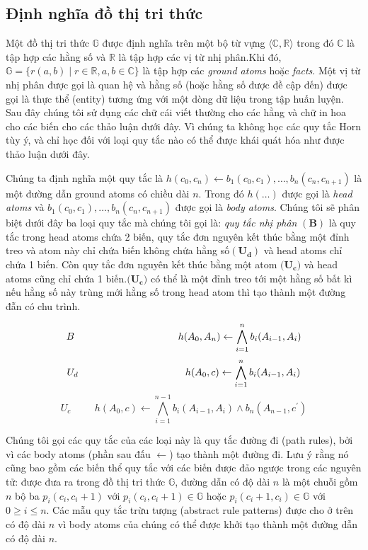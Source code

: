 \subsection{Định nghĩa đồ thị  tri thức}
Một đồ thị tri thức \(\mathbb{G}\) được định nghĩa trên một bộ từ vựng \(\langle \mathbb{C}, \mathbb{R} \rangle\) trong đó \(\mathbb{C}\) là tập hợp các hằng số và \(\mathbb{R}\) là tập hợp các vị từ nhị phân.Khi đó, \(\mathbb{G} = \{r (a, b) \mid r \in \mathbb{R}, a, b \in \mathbb{C}\}\) là tập hợp các \textit{ground atoms} hoặc \textit{facts}. Một vị từ nhị phân được gọi là quan hệ và hằng số (hoặc hằng số được đề cập đến) được gọi là thực thể (entity) tương ứng với một dòng dữ liệu trong tập huấn luyện. Sau đây chúng tôi sử dụng các chữ cái viết thường cho các hằng và chữ in hoa cho các biến cho các thảo luận dưới đây. Vì chúng ta không học các quy tắc Horn tùy ý, và chỉ học đối với loại quy tắc nào có thể được khái quát hóa như được thảo luận dưới đây.

Chúng ta định nghĩa một quy tắc là \(h(c_0, c_n) \gets b_1(c_0, c_1) ,\dots ,b_n(c_{n}, c_{n + 1})\) là một đường dẫn ground atoms có chiều dài \(n\). Trong đó \(h(\dots)\) được gọi là \textit{head atoms} và \( b_1(c_0, c_1) ,\dots ,b_n(c_{n}, c_{n + 1})\) được gọi là \textit{body atoms}. Chúng tôi sẽ phân biệt dưới đây ba loại quy tắc mà chúng tôi gọi là: \textit{quy tắc nhị phân} \((\mathbf{B})\) là quy tắc trong head atoms chứa 2 biến, quy tắc đơn nguyên kết thúc bằng một đỉnh treo  và atom này chỉ chứa biến không chứa hằng số\((\mathbf{U_d})\) và head atoms chỉ chứa 1 biến. Còn quy tắc đơn nguyên kết thúc bằng một atom \((\mathbf{U_c)}\) và head atoms cũng chỉ chứa 1 biến.\((\mathbf{U_c)}\)  có thể là một đỉnh treo tới một hằng số bất kì nếu hằng số này trùng mới hằng số trong head atom thì tạo thành một đường đẫn có chu trình.

\[B \hspace{3.7cm} h(A_0,A_n) \gets  \bigwedge^n_{i=1} b_i(A_{i-1}, A_i)\]
\[U_d \hspace{3.8cm} h(A_0,c) \gets  \bigwedge^n_{i=1} b_i(A_{i-1}, A_i)\]
\[U_c \hspace{1cm} h(A_0,c) \gets  \bigwedge^{n-1}_{i=1} b_i(A_{i-1}, A_i) \wedge b_n(A_{n-1}, c^{\prime})\]

Chúng tôi gọi các quy tắc của các loại này là quy tắc đường đi (path rules), bởi vì các body atoms (phần sau đấu \(\gets\)) tạo thành một đường đi. Lưu ý rằng nó cũng bao gồm các biến thể quy tắc với các biến được đảo ngược trong các nguyên tử: được đưa ra trong đồ thị tri thức \(\mathbb{G}\), đường dẫn có độ dài \(n\) là một chuỗi gồm \(n\) bộ ba \(p_i (c_i, c_i + 1)\) với \(p_i (c_i, c_i + 1) \in \mathbb{G}\) hoặc \(p_i (c_i + 1, c_i) \in \mathbb{G}\) với \(0 \geq i \leq n\). Các mẫu quy tắc trừu tượng (abstract rule patterns) được cho ở trên có độ dài \(n\) vì body atoms của chúng có thể được khởi tạo thành một đường dẫn có độ dài \(n\).

